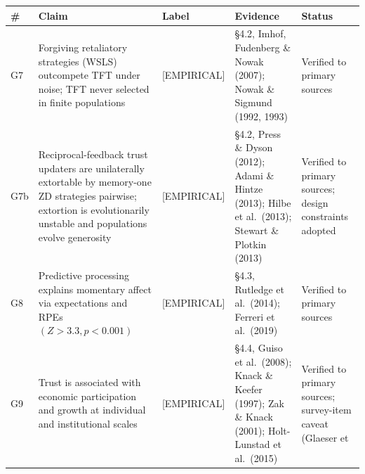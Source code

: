 \documentclass[
]{article}
\newcounter{none} %
\begin{document}
{\def\LTcaptype{none} %
\begin{longtable}[]{@{}
  >{\raggedright\arraybackslash}p{}
  >{\raggedright\arraybackslash}p{}
  >{\raggedright\arraybackslash}p{}
  >{\raggedright\arraybackslash}p{}
  >{\raggedright\arraybackslash}p{}@{}}
\toprule\noalign{}
\begin{minipage}[b]{\linewidth}\raggedright
\textbf{\#}
\end{minipage} & \begin{minipage}[b]{\linewidth}\raggedright
\textbf{Claim}
\end{minipage} & \begin{minipage}[b]{\linewidth}\raggedright
\textbf{Label}
\end{minipage} & \begin{minipage}[b]{\linewidth}\raggedright
\textbf{Evidence}
\end{minipage} & \begin{minipage}[b]{\linewidth}\raggedright
\textbf{Status}
\end{minipage} \\
\midrule\noalign{}
\endhead
\bottomrule\noalign{}
\endlastfoot
G7 & Forgiving retaliatory strategies (WSLS) outcompete TFT under noise;
TFT never selected in finite populations & {[}EMPIRICAL{]} & §4.2,
Imhof, Fudenberg \& Nowak (2007); Nowak \& Sigmund (1992, 1993) &
Verified to primary sources \\
G7b & Reciprocal-feedback trust updaters are unilaterally extortable by
memory-one ZD strategies pairwise; extortion is evolutionarily unstable
and populations evolve generosity & {[}EMPIRICAL{]} & §4.2, Press \&
Dyson (2012); Adami \& Hintze (2013); Hilbe et al.~(2013); Stewart \&
Plotkin (2013) & Verified to primary sources; design constraints
adopted \\
G8 & Predictive processing explains momentary affect via expectations
and RPEs \((Z > 3.3, p < 0.001)\) & {[}EMPIRICAL{]} & §4.3, Rutledge et
al.~(2014); Ferreri et al.~(2019) & Verified to primary sources \\
G9 & Trust is associated with economic participation and growth at
individual and institutional scales & {[}EMPIRICAL{]} & §4.4, Guiso et
al.~(2008); Knack \& Keefer (1997); Zak \& Knack (2001); Holt-Lunstad et
al.~(2015) & Verified to primary sources; survey-item caveat (Glaeser et

\end{longtable}}
\end{document}

